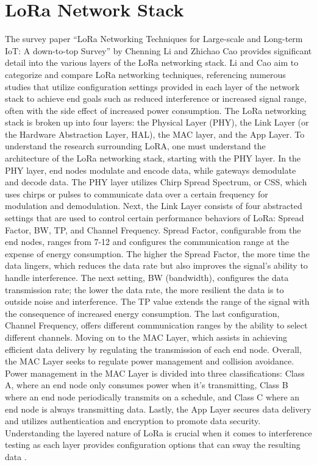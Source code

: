 \documentclass[sigsmall]{acmart}
\begin{document}
\section*{LoRa Network Stack}
The survey paper “LoRa Networking Techniques for Large-scale and Long-term IoT: A down-to-top Survey” by Chenning Li and Zhichao Cao provides significant detail into the various layers of the LoRa networking stack. Li and Cao aim to categorize and compare LoRa networking techniques, referencing numerous studies that utilize configuration settings provided in each layer of the network stack to achieve end goals such as reduced interference or increased signal range, often with the side effect of increased power consumption. The LoRa networking stack is broken up into four layers: the Physical Layer (PHY), the Link Layer (or the Hardware Abstraction Layer, HAL), the MAC layer, and the App Layer.  To understand the research surrounding LoRA, one must understand the architecture of the LoRa networking stack, starting with the PHY layer.  In the PHY layer, end nodes modulate and encode data, while gateways demodulate and decode data. The PHY layer utilizes Chirp Spread Spectrum, or CSS, which uses chirps or pulses to communicate data over a certain frequency for modulation and demodulation. Next, the Link Layer consists of four abstracted settings that are used to control certain performance behaviors of LoRa: Spread Factor, BW, TP, and Channel Frequency. Spread Factor, configurable from the end nodes, ranges from 7-12 and configures the communication range at the expense of energy consumption. The higher the Spread Factor, the more time the data lingers, which reduces the data rate but also improves the signal's ability to handle interference. The next setting, BW (bandwidth), configures the data transmission rate; the lower the data rate, the more resilient the data is to outside noise and interference. The TP value extends the range of the signal with the consequence of increased energy consumption. The last configuration, Channel Frequency, offers different communication ranges by the ability to select different channels. Moving on to the MAC Layer, which assists in achieving efficient data delivery by regulating the transmission of each end node. Overall, the MAC Layer seeks to regulate power management and collision avoidance. Power management in the MAC Layer is divided into three classifications: Class A, where an end node only consumes power when it’s transmitting, Class B where an end node periodically transmits on a schedule, and Class C where an end node is always transmitting data. Lastly, the App Layer secures data delivery and utilizes authentication and encryption to promote data security. Understanding the layered nature of LoRa is crucial when it comes to interference testing as each layer provides configuration options that can sway the resulting data \cite{li2022lora}.
\end{document}
